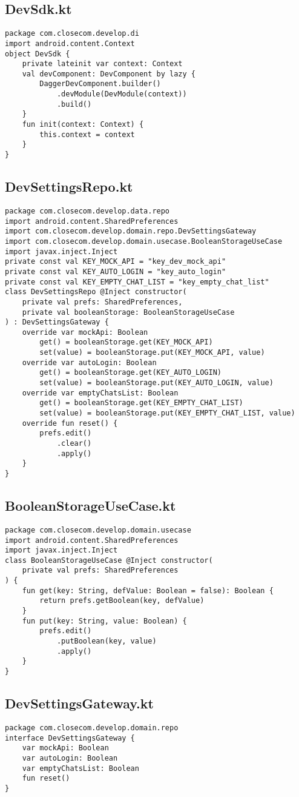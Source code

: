 \documentclass[listing]{espd}
\begin{document}
\subsection{DevSdk.kt}
\begin{verbatim}
package com.closecom.develop.di
import android.content.Context
object DevSdk {
    private lateinit var context: Context
    val devComponent: DevComponent by lazy {
        DaggerDevComponent.builder()
            .devModule(DevModule(context))
            .build()
    }
    fun init(context: Context) {
        this.context = context
    }
}
\end{verbatim}

\subsection{DevSettingsRepo.kt}
\begin{verbatim}
package com.closecom.develop.data.repo
import android.content.SharedPreferences
import com.closecom.develop.domain.repo.DevSettingsGateway
import com.closecom.develop.domain.usecase.BooleanStorageUseCase
import javax.inject.Inject
private const val KEY_MOCK_API = "key_dev_mock_api"
private const val KEY_AUTO_LOGIN = "key_auto_login"
private const val KEY_EMPTY_CHAT_LIST = "key_empty_chat_list"
class DevSettingsRepo @Inject constructor(
    private val prefs: SharedPreferences,
    private val booleanStorage: BooleanStorageUseCase
) : DevSettingsGateway {
    override var mockApi: Boolean
        get() = booleanStorage.get(KEY_MOCK_API)
        set(value) = booleanStorage.put(KEY_MOCK_API, value)
    override var autoLogin: Boolean
        get() = booleanStorage.get(KEY_AUTO_LOGIN)
        set(value) = booleanStorage.put(KEY_AUTO_LOGIN, value)
    override var emptyChatsList: Boolean
        get() = booleanStorage.get(KEY_EMPTY_CHAT_LIST)
        set(value) = booleanStorage.put(KEY_EMPTY_CHAT_LIST, value)
    override fun reset() {
        prefs.edit()
            .clear()
            .apply()
    }
}
\end{verbatim}

\subsection{BooleanStorageUseCase.kt}
\begin{verbatim}
package com.closecom.develop.domain.usecase
import android.content.SharedPreferences
import javax.inject.Inject
class BooleanStorageUseCase @Inject constructor(
    private val prefs: SharedPreferences
) {
    fun get(key: String, defValue: Boolean = false): Boolean {
        return prefs.getBoolean(key, defValue)
    }
    fun put(key: String, value: Boolean) {
        prefs.edit()
            .putBoolean(key, value)
            .apply()
    }
}
\end{verbatim}

\subsection{DevSettingsGateway.kt}
\begin{verbatim}
package com.closecom.develop.domain.repo
interface DevSettingsGateway {
    var mockApi: Boolean
    var autoLogin: Boolean
    var emptyChatsList: Boolean
    fun reset()
}
\end{verbatim}



\end{document}
